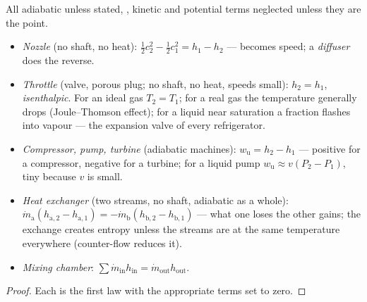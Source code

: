 \begin{proposition}\label{prop:b2:open-systems:devices}
All adiabatic unless stated, , kinetic and potential terms
neglected unless they are the point.
\begin{itemize}
\item \emph{Nozzle} (no shaft, no heat): $\tfrac12c_2^2 -
      \tfrac12c_1^2 = h_1 - h_2$ ---  becomes speed; a
      \emph{diffuser} does the reverse.
\item \emph{Throttle} (valve, porous plug; no shaft,
      no heat, speeds small): $h_2 = h_1$, \emph{isenthalpic}. For an
      ideal gas $T_2 = T_1$; for a real gas the temperature generally
      drops (Joule--Thomson effect); for a liquid near saturation a
      fraction flashes into vapour --- the expansion valve of every
      refrigerator.
\item \emph{Compressor, pump, turbine} (adiabatic
      machines): $w_{\text{u}} = h_2 - h_1$ --- positive for a compressor,
      negative for a turbine; for a liquid pump $w_{\text{u}} \approx
      v(P_2 - P_1)$, tiny because $v$ is small.
\item \emph{Heat exchanger} (two streams, no
      shaft, adiabatic as a whole): $\dot m_{\text{a}}(h_{\text{a},2} -
      h_{\text{a},1}) = -\dot m_{\text{b}}(h_{\text{b},2} - h_{\text{b},1})$
      --- what one loses the other gains; the exchange creates entropy
      unless the streams are at the same temperature everywhere
      (counter-flow reduces it).
\item \emph{Mixing chamber}: $\sum\dot m_{\text{in}}h_{\text{in}} = \dot
      m_{\text{out}}h_{\text{out}}$.
\end{itemize}
\end{proposition}

\begin{proof}
Each is the first law with the appropriate terms set to zero.
\end{proof}

